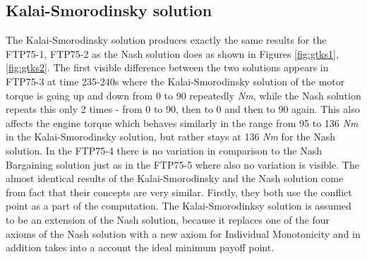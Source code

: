 \subsection{Kalai-Smorodinsky solution}
The Kalai-Smorodinsky solution produces exactly the same results for the FTP75-1, FTP75-2 as the Nash solution does as shown in Figures \ref{fig:gtks1}, \ref{fig:gtks2}. The first visible difference between the two solutions appears in FTP75-3 at time 235-240s where the Kalai-Smorodinsky solution of the motor torque is going up and down from 0 to 90 repeatedly \textit{Nm}, while the Nash solution repeats this only 2 times - from 0 to 90, then to 0 and then to 90 again. This also affects the engine torque which behaves similarly in the range from 95 to 136 \textit{Nm} in the Kalai-Smorodinsky solution, but rather stays at 136 \textit{Nm} for the Nash solution. In the FTP75-4 there is no variation in comparison to the Nash Bargaining solution just as in the FTP75-5 where also no variation is visible. The almost identical results of the Kalai-Smorodinsky and the Nash solution come from fact that their concepts are very similar. Firstly, they both use the conflict point as a part of the computation. The Kalai-Smorodinksy solution is assumed to be an extension of the Nash solution, because it replaces one of the four axioms of the Nash solution with a new axiom for Individual Monotonicity and in addition takes into a account the ideal minimum payoff point.


